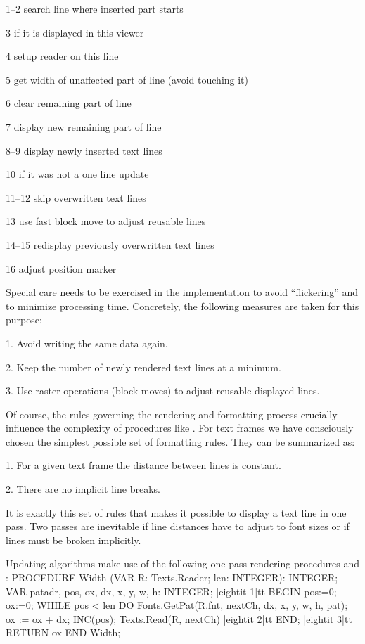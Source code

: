 \item{1--2} search line where inserted part starts
\item{3} if it is displayed in this viewer
\item{4} setup reader on this line
\item{5} get width of unaffected part of line (avoid touching it)
\item{6} clear remaining part of line
\item{7} display new remaining part of line
\item{8--9} display newly inserted text lines
\item{10} if it was not a one line update
\item{11--12} skip overwritten text lines
\item{13} use fast block move to adjust reusable lines
\item{14--15} redisplay previously overwritten text lines
\item{16} adjust position marker

\noindent Special care needs to be exercised in the implementation to avoid ``flickering'' and to minimize processing time. Concretely, the following measures are taken for this purpose:

\item{1.} Avoid writing the same data again.
\item{2.} Keep the number of newly rendered text lines at a minimum.
\item{3.} Use raster operations (block moves) to adjust reusable displayed lines.

\noindent Of course, the rules governing the rendering and formatting process crucially influence the complexity of procedures like . For text frames we have consciously chosen the simplest possible set of formatting rules. They can be summarized as:

\item{1.} For a given text frame the distance between lines is constant.
\item{2.} There are no implicit line breaks.

\noindent It is exactly this set of rules that makes it possible to display a text line in one pass. Two passes are inevitable if line distances have to adjust to font sizes or if lines must be broken implicitly.

Updating algorithms make use of the following one-pass rendering procedures  and :
\begintt
PROCEDURE Width (VAR R: Texts.Reader; len: INTEGER): INTEGER;
  VAR patadr, pos, ox, dx, x, y, w, h: INTEGER;
|eightit 1|tt BEGIN pos:=0; ox:=0;
    WHILE pos < len DO
      Fonts.GetPat(R.fnt, nextCh, dx, x, y, w, h, pat);
      ox := ox + dx; INC(pos); Texts.Read(R, nextCh)
|eightit 2|tt  END;
|eightit 3|tt  RETURN ox
END Width;
\endtt


